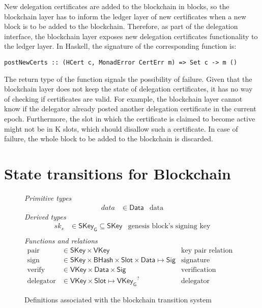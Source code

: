 \documentclass[11pt,a4paper]{article}
\newcommand{\type}[1]{\mathsf{#1}}
\newcommand{\BHash}{\type{BHash}}  %
\newcommand{\Slot}{\type{Slot}}
\newcommand{\SKey}{\type{SKey}}
\newcommand{\SKeyGen}{\type{SKey_G}}
\newcommand{\VKey}{\type{VKey}}
\newcommand{\VKeyGen}{\type{VKey_G}}
\newcommand{\Sig}{\type{Sig}}
\newcommand{\Data}{\type{Data}}
\newcommand{\signname}{sign}
\newcommand{\verifyname}{verify}
\newcommand{\keypairname}{pair}
\newcommand{\delegatorname}{delegator} %
\newcommand{\partialf}{\mapsto}
\begin{document}
New delegation certificates are added to the blockchain in blocks, so the
blockchain layer has to inform the ledger layer of new certificates when a new
block is to be added to the blockchain.
%
Therefore, as part of the delegation interface, the blockchain layer exposes
new delegation certificates functionality to the ledger layer.
%
In Haskell, the signature of the corresponding function is:
%
\begin{lstlisting}
postNewCerts :: (HCert c, MonadError CertErr m) => Set c -> m ()
\end{lstlisting}
%
The return type of the function signals the possibility of failure.
%
Given that the blockchain layer does not keep the state of delegation
certificates, it has no way of checking if certificates are valid.
%
For example, the blockchain layer cannot know if the delegator already posted
another delegation certificate in the current epoch.
%
Furthermore, the slot in which the certificate is claimed to become active
might not be in K slots, which should disallow such a certificate.
%
In case of failure, the whole block to be added to the blockchain is
discarded.


\section{State transitions for Blockchain}
\label{sec:state-trans-chain}

\begin{figure}[h]
  \emph{Primitive types}
  \begin{align*}
  data & \in \Data    & \text{data}
  \end{align*}
  \emph{Derived types}
  \begin{align*}
    sk_s & \in \SKeyGen \subseteq \SKey & \text{genesis block's signing key}\\
  \end{align*}
  \emph{Functions and relations}
  \begin{align*}
    \text{\keypairname} & \in \SKey \times \VKey & \text{key pair relation}\\
    \text{\signname} & \in \SKey \times \BHash \times \Slot \times \Data \partialf \Sig
      & \text{signature function}\\
    \text{\verifyname} & \in \VKey \times \Data \times \Sig
      & \text{verification relation}\\
    \text{\delegatorname} & \in \VKey \times \Slot \partialf \VKeyGen^?
      & \text{delegator function}
  \end{align*}
  \caption{Definitions associated with the blockchain transition system}
  \label{fig:state-trans-abstract}
\end{figure}
\end{document}
